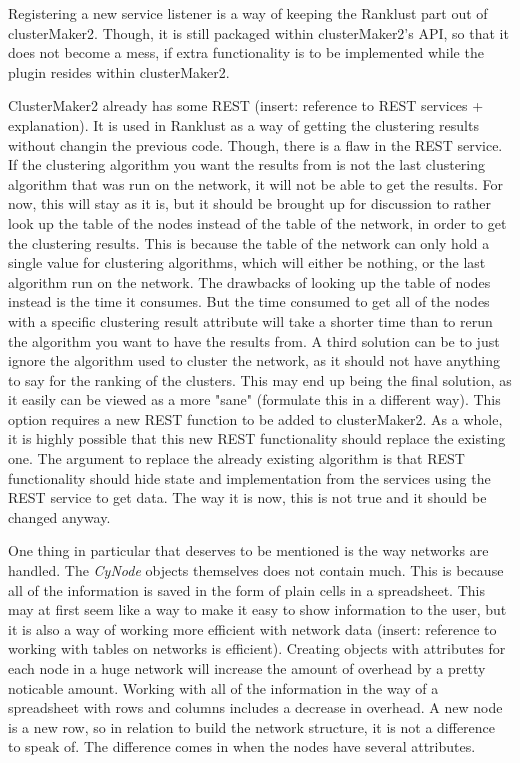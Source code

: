 \documentclass[UKenglish]{ifimaster}
\begin{document}
Registering a new service listener is a way of keeping the Ranklust part out of
clusterMaker2. Though, it is still packaged within clusterMaker2's API, so that
it does not become a mess, if extra functionality is to be implemented while the
plugin resides within clusterMaker2.

ClusterMaker2 already has some REST (insert: reference to REST services +
explanation). It is used in Ranklust as a way of getting the clustering results
without changin the previous code. Though, there is a flaw in the REST service.
If the clustering algorithm you want the results from is not the last clustering
algorithm that was run on the network, it will not be able to get the results.
For now, this will stay as it is, but it should be brought up for discussion to
rather look up the table of the nodes instead of the table of the network, in
order to get the clustering results. This is because the table of the network
can only hold a single value for clustering algorithms, which will either be
nothing, or the last algorithm run on the network. The drawbacks of looking up
the table of nodes instead is the time it consumes. But the time consumed to get
all of the nodes with a specific clustering result attribute will take a shorter
time than to rerun the algorithm you want to have the results from. A third
solution can be to just ignore the algorithm used to cluster the network, as it
should not have anything to say for the ranking of the clusters. This may end up
being the final solution, as it easily can be viewed as a more "sane" (formulate
this in a different way). This option requires a new REST function to be added
to clusterMaker2. As a whole, it is highly possible that this new REST
functionality should replace the existing one. The argument to replace the
already existing algorithm is that REST functionality should hide state and
implementation from the services using the REST service to get data. The way it
is now, this is not true and it should be changed anyway.

One thing in particular that deserves to be mentioned is the way networks are
handled. The \textit{CyNode} objects themselves does not contain much. This is
because all of the information is saved in the form of plain cells in a
spreadsheet. This may at first seem like a way to make it easy to show
information to the user, but it is also a way of working more efficient with
network data (insert: reference to working with tables on networks is
efficient). Creating objects with attributes for each node in a huge network
will increase the amount of overhead by a pretty noticable amount. Working with
all of the information in the way of a spreadsheet with rows and columns
includes a decrease in overhead. A new node is a new row, so in relation to
build the network structure, it is not a difference to speak of.  The difference
comes in when the nodes have several attributes. 
\end{document}
